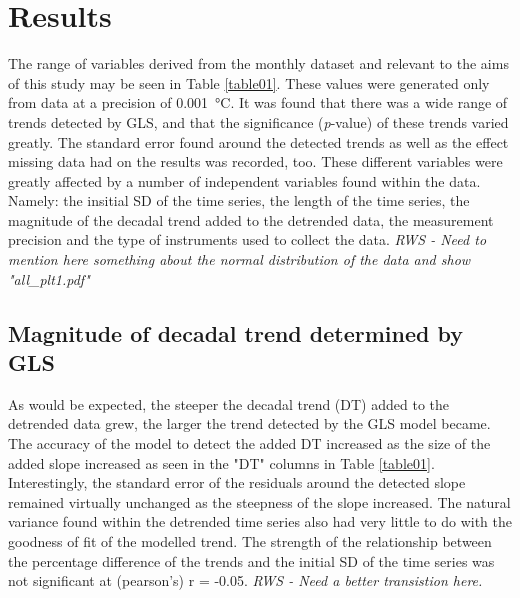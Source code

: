 \documentclass{ametsoc}
\begin{document}
\section{Results}
The range of variables derived from the monthly dataset and relevant to the aims of this study may be seen in Table \ref{table01}. These values were generated only from data at a precision of \SI{0.001}{\degreeCelsius}. It was found that there was a wide range of trends detected by GLS, and that the significance (\emph{p}-value) of these trends varied greatly. The standard error found around the detected trends as well as the effect missing data had on the results was recorded, too. These different variables were greatly affected by a number of independent variables found within the data. Namely: the insitial SD of the time series, the length of the time series, the magnitude of the decadal trend added to the detrended data, the measurement precision and the type of instruments used to collect the data.
\emph{RWS - Need to mention here something about the normal distribution of the data and show "all_plt1.pdf"}

%


\subsection{Magnitude of decadal trend determined by GLS}
As would be expected, the steeper the decadal trend (DT) added to the detrended data grew, the larger the trend detected by the GLS model became. The accuracy of the model to detect the added DT increased as the size of the added slope increased as seen in the "DT" columns in Table \ref{table01}. Interestingly, the standard error of the residuals around the detected slope remained virtually unchanged as the steepness of the slope increased. The natural variance found within the detrended time series also had very little to do with the goodness of fit of the modelled trend. The strength of the relationship between the percentage difference of the trends and the initial SD of the time series was not significant at (pearson's) r = -0.05.
\emph{RWS - Need a better transistion here.}
\end{document}
